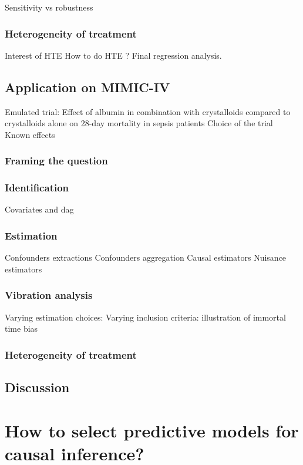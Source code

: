 \documentclass{report}
\begin{document}
Sensitivity vs robustness

\subsection{Heterogeneity of treatment}

Interest of HTE
How to do HTE ? Final regression analysis.

\section{Application on MIMIC-IV}\label{sec:causal_tuto:application}

Emulated trial: Effect of albumin in combination with crystalloids compared to crystalloids alone on 28-day mortality in sepsis patients
Choice of the trial
Known effects

\subsection{Framing the question}\label{subsec:causal_tuto:framing_mimic}

\subsection{Identification}
Covariates and dag

\subsection{Estimation}
Confounders extractions
Confounders aggregation
Causal estimators
Nuisance estimators

\subsection{Vibration analysis}
Varying estimation choices:
Varying inclusion criteria: illustration of immortal time bias

\subsection{Heterogeneity of treatment}

\section{Discussion}\label{subsec:causal_tuto:discussion}

\chapter{How to select predictive models for causal inference?}\label{chapter:causal_model_selection}
\end{document}
